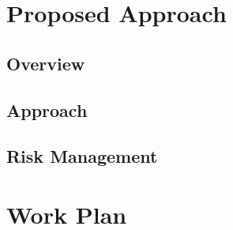 \documentclass{mprop}
\begin{document}
\par

\section{Proposed Approach}

\par

\subsection{Overview}

\par

\subsection{Approach}

\par

\par

\par

\subsection{Risk Management}

\par

\section{Work Plan}
\end{document}
